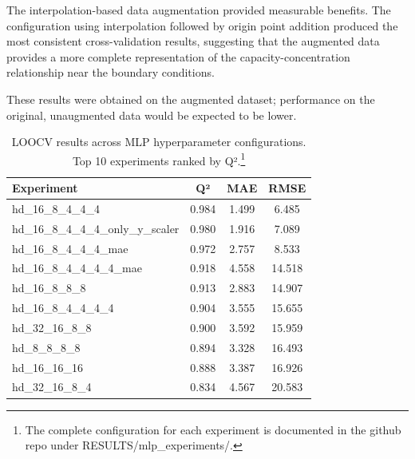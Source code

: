 The interpolation-based data augmentation provided measurable benefits. The configuration using interpolation followed by origin point addition produced the most consistent cross-validation results, suggesting that the augmented data provides a more complete representation of the capacity-concentration relationship near the boundary conditions.

These results were obtained on the augmented dataset; performance on the original, unaugmented data would be expected to be lower.

\begin{table}[htbp]
	\centering
	\caption[LOOCV results across MLP hyperparameter configurations.]{LOOCV results across MLP hyperparameter configurations. Top 10 experiments ranked by Q².\footnote{\raggedright The complete configuration for each experiment is documented in the github repo \cite{repo} under RESULTS/mlp\_experiments/.}}
	\label{tab:q2_leaderboard}
	\begin{tabular}{lccc}
		\toprule
		\textbf{Experiment}                 & \textbf{Q²} & \textbf{MAE} & \textbf{RMSE} \\
		\midrule
		hd\_16\_8\_4\_4\_4                  & 0.984       & 1.499        & 6.485         \\
		hd\_16\_8\_4\_4\_4\_only\_y\_scaler & 0.980       & 1.916        & 7.089         \\
		hd\_16\_8\_4\_4\_4\_mae             & 0.972       & 2.757        & 8.533         \\
		hd\_16\_8\_4\_4\_4\_4\_mae          & 0.918       & 4.558        & 14.518        \\
		hd\_16\_8\_8\_8                     & 0.913       & 2.883        & 14.907        \\
		hd\_16\_8\_4\_4\_4\_4               & 0.904       & 3.555        & 15.655        \\
		hd\_32\_16\_8\_8                    & 0.900       & 3.592        & 15.959        \\
		hd\_8\_8\_8\_8                      & 0.894       & 3.328        & 16.493        \\
		hd\_16\_16\_16                      & 0.888       & 3.387        & 16.926        \\
		hd\_32\_16\_8\_4                    & 0.834       & 4.567        & 20.583        \\
		\bottomrule
	\end{tabular}
\end{table}

